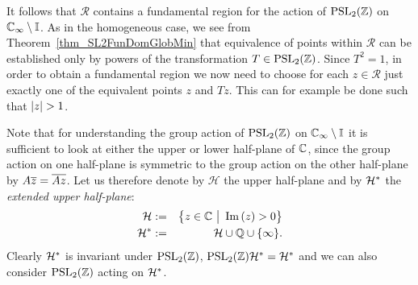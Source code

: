 It follows that $\mathcal{R}$ contains a fundamental region for the action of $\operatorname{PSL}_{2}(\mathbb{Z})$ on $\mathbb{C}_{\infty} \setminus \mathbb{I}$. As in the homogeneous case, we see from Theorem~\ref{thm_SL2FunDomGlobMin} that equivalence of points within $\mathcal{R}$ can be established only by powers of the transformation $T \in \operatorname{PSL}_{2}(\mathbb{Z})$. Since $T^2 = 1$, in order to obtain a fundamental region we now need to choose for each $z \in \mathcal{R}$ just exactly one of the equivalent points $z$ and $Tz$. This can for example be done such that $\left|z\right| > 1$.

Note that for understanding the group action of $\operatorname{PSL}_{2}(\mathbb{Z})$ on $\mathbb{C}_{\infty} \setminus \mathbb{I}$ it is sufficient to look at either the upper or lower half-plane of $\mathbb{C}$, since the group action on one half-plane is symmetric to the group action on the other half-plane by $A\overline{z} = \overline{Az}$. Let us therefore denote by $\mathcal{H}$ the upper half-plane and by $\mathcal{H}^\ast$ the \emph{extended upper half-plane}:
\begin{eqnarray}
\label{eqn_Upperhalfplane}\mathcal{H} &:=& \big\{ z \in \mathbb{C} \ \big| \ \operatorname{Im}\left(z\right) > 0 \big\} \\
\label{eqn_ExtUpperhalfplane}
\mathcal{H}^\ast &:=& \mathcal{H} \cup \mathbb{Q} \cup \{\infty\}.
\end{eqnarray}
Clearly $\mathcal{H}^\ast$ is invariant under $\operatorname{PSL}_{2}(\mathbb{Z})$, \ie $\operatorname{PSL}_{2}(\mathbb{Z}) \mathcal{H}^\ast = \mathcal{H}^\ast$ and we can also consider $\operatorname{PSL}_{2}(\mathbb{Z})$ acting on $\mathcal{H}^\ast$.


